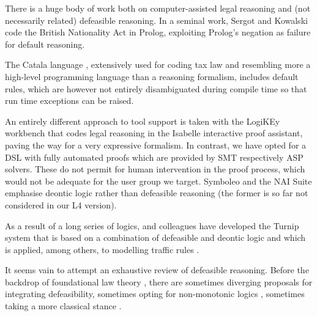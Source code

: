 There is a huge body of work both on computer-assisted legal reasoning and
(not necessarily related) defeasible reasoning. In a seminal work, Sergot and Kowalski
\cite{sergot_kowalski_etal__british_nationality_acm_1986,kowalski_legislation_logic_programs_1995}
code the British Nationality Act in Prolog, exploiting Prolog's negation as
failure for default reasoning.



The Catala language \cite{merigoux_chataing_protzenko_cata_icfp_2021},
extensively used for coding tax law and resembling more a high-level
programming language than a reasoning formalism, includes default rules, which
are however not entirely disambiguated during compile time so that run time
exceptions can be raised.

An entirely different approach to tool support is taken with the LogiKEy \cite{benzmueller_etal_logikey_2020}
workbench that codes legal reasoning in the Isabelle interactive proof assistant, paving
the way for a very expressive formalism. In contrast, we have opted for a DSL
with fully automated proofs which are provided by SMT respectively ASP solvers. These do not permit for human intervention in the proof process, which would not be adequate for the user group we target. Symboleo
\cite{sharifi_parvizimosaed_amyot_logrippo_mylopoulos_Symboleo_spec_legal_contracts_2020}
and the NAI Suite
\cite{libal_steen_nai_suite_draft_reason_legal_texts_jurix_2019} emphasise
deontic logic rather than defeasible reasoning (the former is so far not
considered in our L4 version).

As a result of a long series of logics,
\cite{governatori21:_unrav_legal_refer_defeas_deont_logic} 
and colleagues have developed the Turnip system
that is based on a
combination of defeasible and deontic logic and which is applied, among
others, to modelling traffic rules
\cite{governatori_Traffic_Rules_Encoding_using_Defeasible_jurix_2020}.

It seems vain to attempt an exhaustive
review of defeasible reasoning. Before the backdrop of foundational law
theory \cite{hart_concept_of_law_1997}, there are sometimes diverging
proposals for integrating defeasibility, sometimes opting for non-monotonic
logics \cite{hage_law_and_defeasibility_2003}, sometimes taking a more
classical stance \cite{alchourron_makinson_hierarchies_of_regulations_1981}. 

